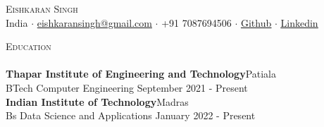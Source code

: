 \documentclass[a4paper]{article}
\newcommand{\lineunder} {
    \vspace*{-8pt} \\
    \hspace*{-18pt} \hrulefill \\
}
\newcommand{\header} [1] {
    {\hspace*{-18pt}\vspace*{6pt} \textsc{#1}}
    \vspace*{-6pt} \lineunder
}
\begin{document}
\vspace*{-40pt}

    

\vspace*{-9pt}
\begin{center}
	{\Huge \scshape {Eishkaran Singh}}\\
	\vspace{1mm}
	India $\cdot$ \underline{eishkaransingh@gmail.com} $\cdot$ +91 7087694506 $\cdot$ \href{https://github.com/EISHKARAN}{\underline{Github}} $\cdot$ \href{https://www.linkedin.com/in/eishkaran-singh/}{\underline{Linkedin}} \\
\end{center}

\vspace{0.25mm}
\header{Education}
\vspace{0mm}
\textbf{Thapar Institute of Engineering and Technology}\hfill Patiala\\
BTech Computer  Engineering \hfill September 2021 - Present\\
\vspace{0.5mm}
\textbf{Indian Institute of Technology}\hfill Madras\\
Bs Data Science and Applications \hfill January 2022 - Present\\
\vspace{1mm}

 

\end{document}
